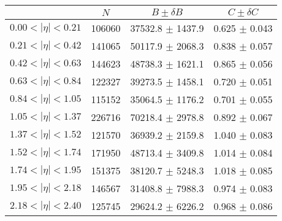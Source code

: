 \begin{tabular}{lccc}
\hline
    &   $N$   & $B \pm \delta B$  &  $C \pm \delta C$ \\
\hline
$0.00 < |\eta| <0.21$          & 106060     & 37532.8    $\pm$ 1437.9 & 0.625      $\pm$ 0.043 \\
$0.21 < |\eta| <0.42$          & 141065     & 50117.9    $\pm$ 2068.3 & 0.838      $\pm$ 0.057 \\
$0.42 < |\eta| <0.63$          & 144623     & 48738.3    $\pm$ 1621.1 & 0.865      $\pm$ 0.056 \\
$0.63 < |\eta| <0.84$          & 122327     & 39273.5    $\pm$ 1458.1 & 0.720      $\pm$ 0.051 \\
$0.84 < |\eta| <1.05$          & 115152     & 35064.5    $\pm$ 1176.2 & 0.701      $\pm$ 0.055 \\
$1.05 < |\eta| <1.37$          & 226716     & 70218.4    $\pm$ 2978.8 & 0.892      $\pm$ 0.067 \\
$1.37 < |\eta| <1.52$          & 121570     & 36939.2    $\pm$ 2159.8 & 1.040      $\pm$ 0.083 \\
$1.52 < |\eta| <1.74$          & 171950     & 48713.4    $\pm$ 3409.8 & 1.014      $\pm$ 0.084 \\
$1.74 < |\eta| <1.95$          & 151375     & 38120.7    $\pm$ 5248.3 & 1.018      $\pm$ 0.085 \\
$1.95 < |\eta| <2.18$          & 146567     & 31408.8    $\pm$ 7988.3 & 0.974      $\pm$ 0.083 \\
$2.18 < |\eta| <2.40$          & 125745     & 29624.2    $\pm$ 6226.2 & 0.968      $\pm$ 0.086 \\
\hline
\end{tabular}
